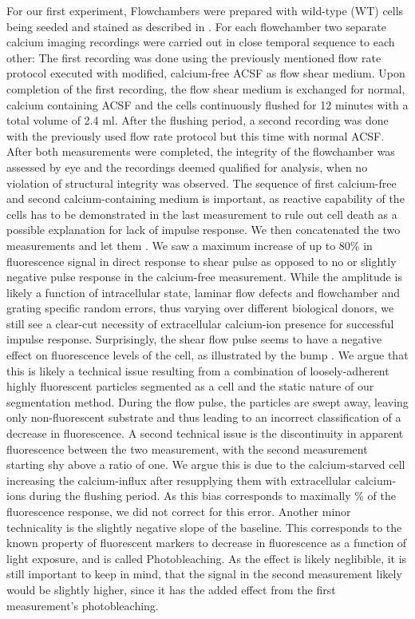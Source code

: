 For our first experiment, Flowchambers were prepared with wild-type (WT) cells being seeded and stained as described in . For each flowchamber two separate calcium imaging recordings were carried out in close temporal sequence to each other: The first recording was done using the previously mentioned flow rate protocol executed with modified, calcium-free ACSF as flow shear medium. Upon completion of the first recording, the flow shear medium is exchanged for normal, calcium containing ACSF and the cells continuously flushed for 12 minutes with a total volume of 2.4 ml. After the flushing period, a second recording was done with the previously used flow rate protocol but this time with normal ACSF. After both measurements were completed, the integrity of the flowchamber was assessed by eye and the recordings deemed qualified for analysis, when no violation of structural integrity was observed. The sequence of first calcium-free and second calcium-containing medium is important, as reactive capability of the cells has to be demonstrated in the last measurement to rule out cell death as a possible explanation for lack of impulse response. We then concatenated the two measurements and let them . We saw a maximum increase of up to 80\% in fluorescence signal in direct response to shear pulse as opposed to no or slightly negative pulse response in the calcium-free measurement. While the amplitude is likely a function of intracellular state, laminar flow defects and flowchamber and grating specific random errors, thus varying over different biological donors, we still see a clear-cut necessity of extracellular calcium-ion presence for successful impulse response. Surprisingly, the shear flow pulse seems to have a negative effect on fluorescence levels of the cell, as illustrated by the bump . We argue that this is likely a technical issue resulting from a combination of loosely-adherent highly fluorescent particles segmented as a cell and the static nature of our segmentation method. During the flow pulse, the particles are swept away, leaving only non-fluorescent substrate and thus leading to an incorrect classification of a decrease in fluorescence. A second technical issue is the discontinuity in apparent fluorescence between the two measurement, with the second measurement starting shy above a ratio of one. We argue this is due to the calcium-starved cell increasing the calcium-influx after resupplying them with extracellular calcium-ions during the flushing period. As this bias corresponds to maximally \% of the fluorescence response, we did not correct for this error. Another minor technicality is the slightly negative slope of the baseline. This corresponds to the known property of fluorescent markers to decrease in fluorescence as a function of light exposure, and is called Photobleaching. As the effect is likely neglibible, it is still important to keep in mind, that the signal in the second measurement likely would be slightly higher, since it has the added effect from the first measurement's photobleaching.

